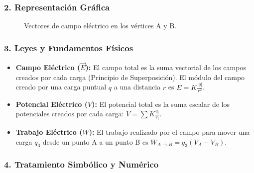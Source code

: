 \subsubsection*{2. Representación Gráfica}
\begin{figure}[H]
    \centering
    \caption{Vectores de campo eléctrico en los vértices A y B.}
\end{figure}

\subsubsection*{3. Leyes y Fundamentos Físicos}
\begin{itemize}
    \item \textbf{Campo Eléctrico ($\vec{E}$):} El campo total es la suma vectorial de los campos creados por cada carga (Principio de Superposición). El módulo del campo creado por una carga puntual $q$ a una distancia $r$ es $E = K\frac{|q|}{r^2}$.
    \item \textbf{Potencial Eléctrico ($V$):} El potencial total es la suma escalar de los potenciales creados por cada carga: $V = \sum K\frac{q_i}{r_i}$.
    \item \textbf{Trabajo Eléctrico ($W$):} El trabajo realizado por el campo para mover una carga $q_3$ desde un punto A a un punto B es $W_{A \to B} = q_3 (V_A - V_B)$.
\end{itemize}

\subsubsection*{4. Tratamiento Simbólico y Numérico}
